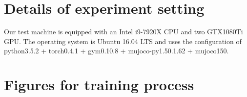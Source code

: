 \appendix

\section{Details of experiment setting}
\label{apdx:detail}
Our test machine is equipped with an Intel i9-7920X CPU and two GTX1080Ti GPU. The operating system is Ubuntu 16.04 LTS and uses the configuration of python3.5.2 + torch0.4.1 + gym0.10.8 + mujoco-py1.50.1.62 + mujoco150.

\section{Figures for training process}
\label{apdx:allfigure}
\begin{figure}[htb]
   \centering

\end{figure}
